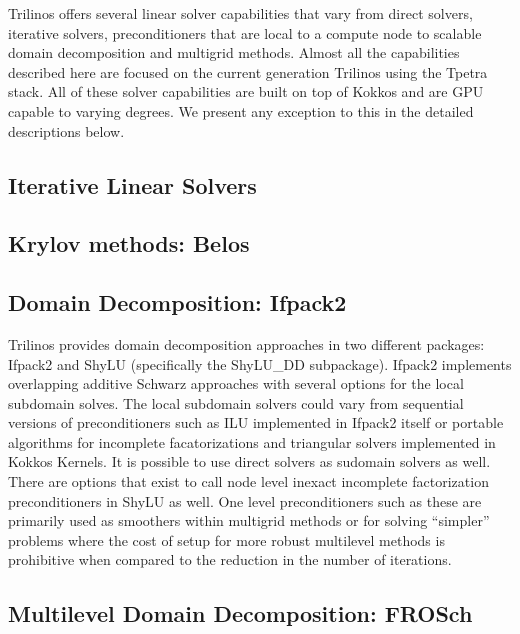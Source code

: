 
Trilinos offers several linear solver capabilities that vary from direct solvers, iterative solvers, preconditioners that are local to a compute node to scalable domain decomposition and multigrid methods. Almost all the capabilities described here are focused on the current generation Trilinos using the Tpetra stack. All of these solver capabilities are built on top of Kokkos and are GPU capable to varying degrees. We present any exception to this in the detailed descriptions below.

\subsection{Iterative Linear Solvers}

\subsection{Krylov methods: Belos}

\subsection{Domain Decomposition: Ifpack2}

Trilinos provides domain decomposition approaches in two different packages: Ifpack2 and ShyLU (specifically the ShyLU\_DD subpackage). Ifpack2 implements overlapping additive Schwarz approaches with several options for the local subdomain solves. The local subdomain solvers could vary from sequential versions of preconditioners such as ILU implemented in Ifpack2 itself or portable algorithms for incomplete facatorizations and triangular solvers implemented in Kokkos Kernels. It is possible to use direct solvers as sudomain solvers as well. There are options that exist to call node level inexact incomplete factorization preconditioners in ShyLU as well. One level preconditioners such as these are primarily used as smoothers within multigrid methods or for solving ``simpler'' problems where the cost of setup for more robust multilevel methods is  prohibitive when compared to the reduction in the number of iterations.


\subsection{Multilevel Domain Decomposition: FROSch}
\label{ssec:frosch}

